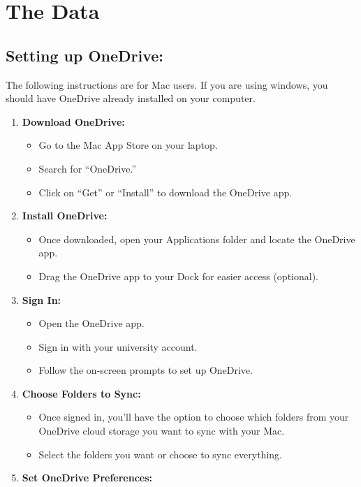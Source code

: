 \documentclass[
]{book}
\providecommand{\tightlist}{%
  \setlength{\itemsep}{0pt}\setlength{\parskip}{0pt}}
\theoremstyle{definition}
\theoremstyle{definition}
\theoremstyle{definition}
\theoremstyle{definition}
\theoremstyle{remark}
\begin{document}
\hypertarget{the-data}{%
\chapter{The Data}\label{the-data}}

\hypertarget{setting-up-onedrive}{%
\section{Setting up OneDrive:}\label{setting-up-onedrive}}

The following instructions are for Mac users. If you are using windows, you should have OneDrive already installed on your computer.

\begin{enumerate}
\def\labelenumi{\arabic{enumi}.}
\tightlist
\item
  \textbf{Download OneDrive:}

  \begin{itemize}
  \tightlist
  \item
    Go to the Mac App Store on your laptop.
  \item
    Search for ``OneDrive.''
  \item
    Click on ``Get'' or ``Install'' to download the OneDrive app.
  \end{itemize}
\item
  \textbf{Install OneDrive:}

  \begin{itemize}
  \tightlist
  \item
    Once downloaded, open your Applications folder and locate the OneDrive app.
  \item
    Drag the OneDrive app to your Dock for easier access (optional).
  \end{itemize}
\item
  \textbf{Sign In:}

  \begin{itemize}
  \tightlist
  \item
    Open the OneDrive app.
  \item
    Sign in with your university account.
  \item
    Follow the on-screen prompts to set up OneDrive.
  \end{itemize}
\item
  \textbf{Choose Folders to Sync:}

  \begin{itemize}
  \tightlist
  \item
    Once signed in, you'll have the option to choose which folders from your OneDrive cloud storage you want to sync with your Mac.
  \item
    Select the folders you want or choose to sync everything.
  \end{itemize}
\item
  \textbf{Set OneDrive Preferences:}


\end{enumerate}
\end{document}
